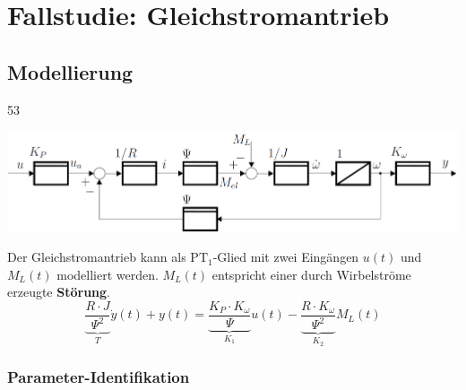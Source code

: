 \section{Fallstudie: Gleichstromantrieb}

\subsection{Modellierung}{53}
\begin{center}
    \includegraphics[width=0.75\columnwidth]{images/vereinfachtes_modell_gleichstromantrieb.png} 
\end{center}
Der Gleichstromantrieb kann als $\text{PT}_1$-Glied mit zwei Eingängen $u(t)$ und $M_L(t)$ modelliert werden. $M_L(t)$ entspricht
einer durch Wirbelströme erzeugte \textbf{Störung}.
$$ \boxed{ \underbrace{\frac{R \cdot J}{\Psi^2}}_{T} \dot{y}(t) + y(t) = \underbrace{\frac{K_P \cdot K_{\omega}}{\Psi}}_{K_1} u(t)
    - \underbrace{\frac{R \cdot K_{\omega}}{\Psi^2}}_{K_2} M_L(t) } $$


\subsubsection{Parameter-Identifikation}

